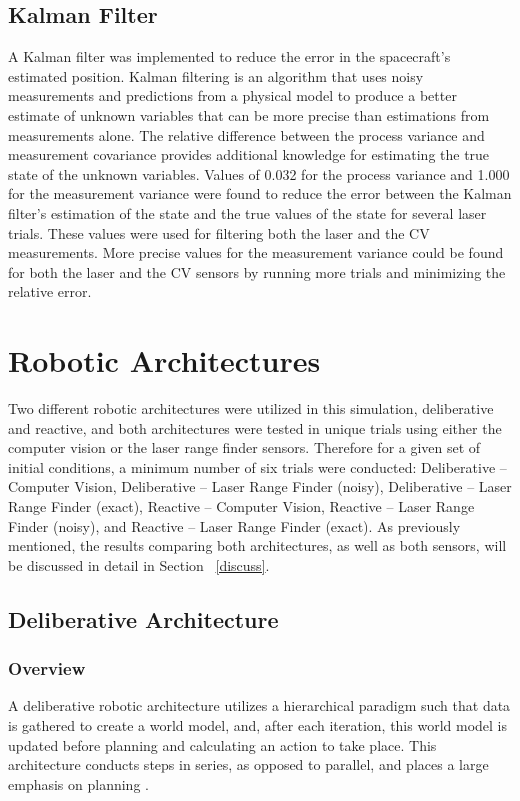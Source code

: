 \documentclass[journal, 10pt]{IEEEtran}
\begin{document}
\subsection{Kalman Filter}
A Kalman filter was implemented to reduce the error in the spacecraft's estimated position. Kalman filtering is an algorithm that uses noisy measurements and predictions from a physical model to produce a better estimate of unknown variables that can be more precise than estimations from measurements alone. The relative difference between the process variance and measurement covariance provides additional knowledge for estimating the true state of the unknown variables. Values of 0.032 for the process variance and 1.000 for the measurement variance were found to reduce the error between the Kalman filter's estimation of the state and the true values of the state for several laser trials. These values were used for filtering both the laser and the CV measurements. More precise values for the measurement variance could be found for both the laser and the CV sensors by running more trials and minimizing the relative error.

\section{Robotic Architectures}
Two different robotic architectures were utilized in this simulation, deliberative and reactive, and both architectures were tested in unique trials using either the computer vision or the laser range finder sensors. Therefore for a given set of initial conditions, a minimum number of six trials were conducted: Deliberative -- Computer Vision, Deliberative -- Laser Range Finder (noisy), Deliberative -- Laser Range Finder (exact), Reactive -- Computer Vision, Reactive -- Laser Range Finder (noisy), and Reactive -- Laser Range Finder (exact). As previously mentioned, the results comparing both architectures, as well as both sensors, will be discussed in detail in Section ~\ref{discuss}.

\subsection{Deliberative Architecture}
\subsubsection{Overview}
A deliberative robotic architecture utilizes a hierarchical paradigm such that data is gathered to create a world model, and, after each iteration, this world model is updated before planning and calculating an action to take place. This architecture conducts steps in series, as opposed to parallel, and places a large emphasis on planning \cite{joshi}.
\end{document}
